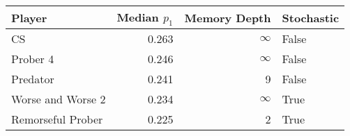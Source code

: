 \begin{tabular}{lrrl}
\toprule
            Player &  Median $p_1$ &  Memory Depth & Stochastic \\
\midrule
                CS &         0.263 &            \(\infty\) &      False \\
          Prober 4 &         0.246 &            \(\infty\) &      False \\
          Predator &         0.241 &             9 &      False \\
 Worse and Worse 2 &         0.234 &            \(\infty\) &       True \\
 Remorseful Prober &         0.225 &             2 &       True \\
\bottomrule
\end{tabular}
